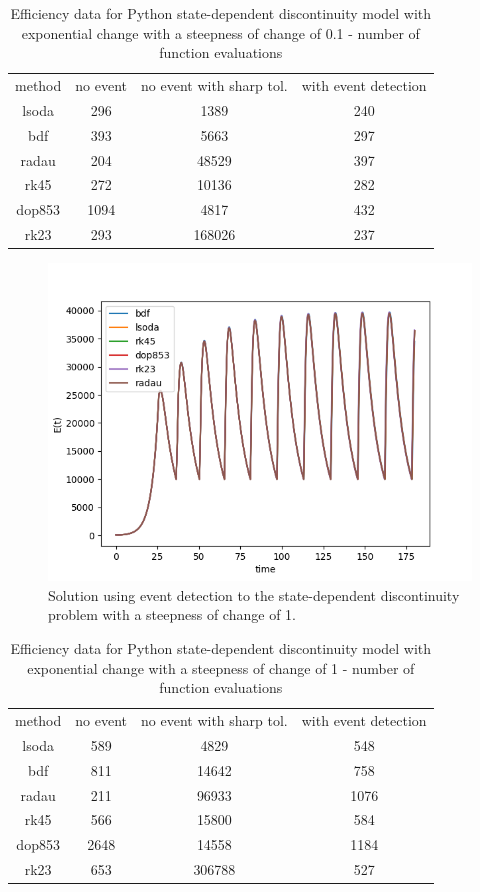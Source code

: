 \begin{table}[h]
\caption {Efficiency data for Python state-dependent discontinuity model with exponential change with a steepness of change of 0.1 - number of function evaluations} \label{tab:exp_state_0_1}
\begin{center}
\begin{tabular}{ c c c c } 
method & no event & no event with sharp tol. & with event detection \\ 
lsoda & 296   & 1389   & 240 \\
bdf & 393     & 5663   & 297 \\
radau & 204   & 48529  & 397 \\
rk45 & 272    & 10136  & 282 \\
dop853 & 1094 & 4817   & 432 \\
rk23 & 293    & 168026 & 237 \\
\end{tabular}
\end{center}
\end{table}

\begin{figure}[H]
\centering
\includegraphics[width=0.7\linewidth]{./figures/exp_state_event_1}
\caption{Solution using event detection to the state-dependent discontinuity problem with a steepness of change of 1.}
\label{fig:exp_state_event_1}
\end{figure}

\begin{table}[h]
\caption {Efficiency data for Python state-dependent discontinuity model with exponential change with a steepness of change of 1 - number of function evaluations} \label{tab:exp_state_1}
\begin{center}
\begin{tabular}{ c c c c } 
method & no event & no event with sharp tol. & with event detection \\ 
lsoda & 589   & 4829    & 548 \\
bdf & 811     & 14642   & 758 \\
radau & 211   & 96933   & 1076 \\
rk45 & 566    & 15800   & 584 \\
dop853 & 2648 & 14558   & 1184 \\
rk23 & 653    & 306788  & 527 \\
\end{tabular}
\end{center}
\end{table}


